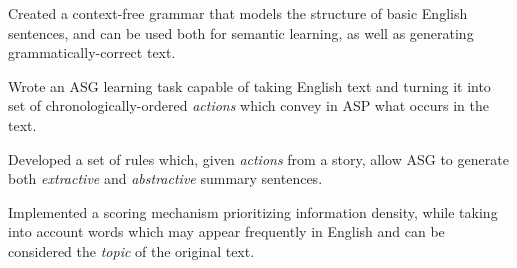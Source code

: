 \begin{contribution}
Created a context-free grammar that models the structure of basic English sentences, and can be used both for semantic learning, as well as generating grammatically-correct text.
\end{contribution}

\begin{contribution}
Wrote an ASG learning task capable of taking English text and turning it into set of chronologically-ordered \textit{actions} which convey in ASP what occurs in the text.
\end{contribution}

\begin{contribution}
Developed a set of rules which, given \textit{actions} from a story, allow ASG to generate both \textit{extractive} and \textit{abstractive} summary sentences.
\end{contribution}

\begin{contribution}
Implemented a scoring mechanism prioritizing information density, while taking into account words which may appear frequently in English and can be considered the \textit{topic} of the original text.
\end{contribution}